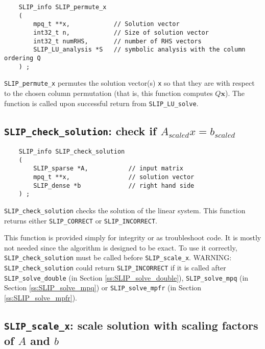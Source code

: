 \documentclass[12pt]{article}
\theoremstyle{definition}
\begin{document}
\begin{mdframed}[userdefinedwidth=6in]
{\footnotesize
\begin{verbatim}
    SLIP_info SLIP_permute_x
    (
        mpq_t **x,            // Solution vector
        int32_t n,            // Size of solution vector
        int32_t numRHS,       // number of RHS vectors
        SLIP_LU_analysis *S   // symbolic analysis with the column ordering Q
    ) ;
\end{verbatim}
} \end{mdframed}


\verb|SLIP_permute_x| permutes the solution vector(s) \verb|x| so that they are
with respect to the chosen column permutation (that is, this function computes
$Q \mathbf{x}$). The function is called upon successful return from
\verb|SLIP_LU_solve|.

\cprotect\subsection{\verb|SLIP_check_solution|: check if $A_{scaled}x=b_{scaled}$}

\begin{mdframed}[userdefinedwidth=6in]
{\footnotesize
\begin{verbatim}
    SLIP_info SLIP_check_solution
    (
        SLIP_sparse *A,           // input matrix
        mpq_t **x,                // solution vector
        SLIP_dense *b             // right hand side
    ) ;
\end{verbatim}
} \end{mdframed}

\verb|SLIP_check_solution| checks the solution of the linear system. This
function returns either \verb|SLIP_CORRECT| or \verb|SLIP_INCORRECT|.

This function is provided simply for integrity or as troubleshoot code. It is
mostly not needed since the algorithm is designed to be exact. To use it
correctly, \verb|SLIP_check_solution| must be called before
\verb|SLIP_scale_x|. WARNING: \verb|SLIP_check_solution| could return
\verb|SLIP_INCORRECT| if it is called after \verb|SLIP_solve_double| (in
Section \ref{ss:SLIP_solve_double}), \verb|SLIP_solve_mpq| (in Section
\ref{ss:SLIP_solve_mpq}) or \verb|SLIP_solve_mpfr| (in Section
\ref{ss:SLIP_solve_mpfr}).


\cprotect\subsection{\verb|SLIP_scale_x|: scale solution with scaling factors of $A$ and $b$}
\label{ss:SLIP_scale_x}
\end{document}
